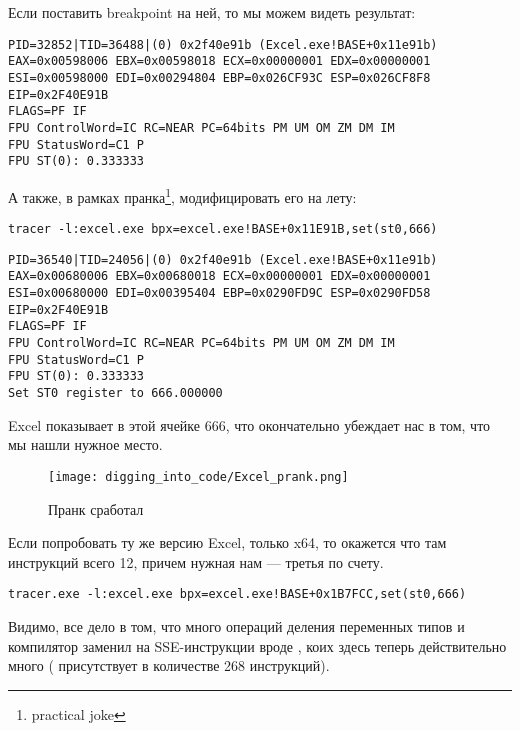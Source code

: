 Если поставить breakpoint на ней, то мы можем видеть результат:

\begin{lstlisting}
PID=32852|TID=36488|(0) 0x2f40e91b (Excel.exe!BASE+0x11e91b)
EAX=0x00598006 EBX=0x00598018 ECX=0x00000001 EDX=0x00000001
ESI=0x00598000 EDI=0x00294804 EBP=0x026CF93C ESP=0x026CF8F8
EIP=0x2F40E91B
FLAGS=PF IF
FPU ControlWord=IC RC=NEAR PC=64bits PM UM OM ZM DM IM 
FPU StatusWord=C1 P 
FPU ST(0): 0.333333
\end{lstlisting}

А также, в рамках пранка\footnote{practical joke}, модифицировать его на лету:

\begin{lstlisting}
tracer -l:excel.exe bpx=excel.exe!BASE+0x11E91B,set(st0,666)
\end{lstlisting}

\begin{lstlisting}
PID=36540|TID=24056|(0) 0x2f40e91b (Excel.exe!BASE+0x11e91b)
EAX=0x00680006 EBX=0x00680018 ECX=0x00000001 EDX=0x00000001
ESI=0x00680000 EDI=0x00395404 EBP=0x0290FD9C ESP=0x0290FD58
EIP=0x2F40E91B
FLAGS=PF IF
FPU ControlWord=IC RC=NEAR PC=64bits PM UM OM ZM DM IM 
FPU StatusWord=C1 P 
FPU ST(0): 0.333333
Set ST0 register to 666.000000
\end{lstlisting}

Excel показывает в этой ячейке 666, что окончательно убеждает нас в том, что мы нашли нужное место.

\begin{figure}[H]
\centering
\texttt{[image: digging\_into\_code/Excel\_prank.png]}
\caption{Пранк сработал}
\end{figure}

Если попробовать ту же версию Excel, только x64, то окажется что там инструкций \FDIV всего 12, 
причем нужная нам --- третья по счету.

\begin{lstlisting}
tracer.exe -l:excel.exe bpx=excel.exe!BASE+0x1B7FCC,set(st0,666)
\end{lstlisting}

Видимо, все дело в том, что много операций деления переменных типов \Tfloat и \Tdouble 
компилятор заменил на SSE-инструкции вроде , 
коих здесь теперь действительно много ( присутствует в количестве 268 инструкций).

